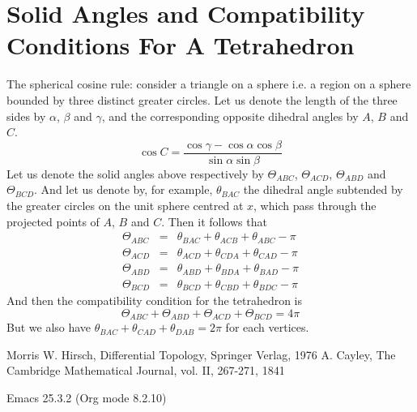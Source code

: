 \documentclass{article}
\begin{document}
\section{Solid Angles and Compatibility Conditions For A Tetrahedron}
\label{sec:orgd228515}
The spherical cosine rule:
consider a triangle on a sphere i.e. a region on a sphere bounded by three distinct greater circles. Let us denote the length of the three sides by \(\alpha\), \(\beta\) and \(\gamma\), and the corresponding opposite dihedral angles by \(A\), \(B\) and \(C\).
\begin{equation}
\label{ }
\cos{C} = \frac{\cos{\gamma} - \cos{\alpha}\cos{\beta} }{\sin{\alpha}\sin{\beta}}
\end{equation}
Let us denote the solid angles above respectively by \(\Theta_{ABC}\), \(\Theta_{ACD}\), \(\Theta_{ABD}\) and \(\Theta_{BCD}\). And let us denote by, for example, \(\theta_{BAC}\) the dihedral angle subtended by the greater circles on the unit sphere centred at \(x\), which pass through the projected points of \(A\), \(B\) and \(C\). Then it follows that 
\begin{eqnarray}
\Theta_{ABC} & = & \theta_{BAC} + \theta_{ACB} + \theta_{ABC} - \pi \\
\Theta_{ACD} & = & \theta_{ACD} + \theta_{CDA} + \theta_{CAD} - \pi \\
\Theta_{ABD} & = & \theta_{ABD} + \theta_{BDA} + \theta_{BAD} - \pi \\
\Theta_{BCD} & = & \theta_{BCD} + \theta_{CBD} + \theta_{BDC} - \pi 
\end{eqnarray}
And then the compatibility condition for the tetrahedron is
\begin{equation}
\label{ }
\Theta_{ABC} + \Theta_{ABD} + \Theta_{ACD} + \Theta_{BCD} = 4\pi
\end{equation}
But we also have \(\theta_{BAC} + \theta_{CAD} + \theta_{DAB} = 2\pi\) for each vertices.
\begin{thebibliography}{10}
  Morris W. Hirsch, Differential Topology, Springer Verlag, 1976
  A. Cayley, The Cambridge Mathematical Journal, vol. II, 267-271, 1841
\end{thebibliography}
Emacs 25.3.2 (Org mode 8.2.10)
\end{document}
